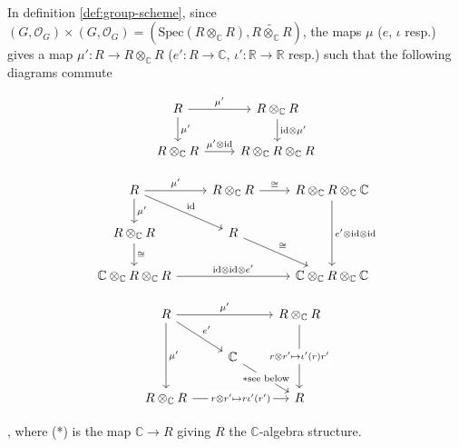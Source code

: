 \documentclass{article}
\theoremstyle{definition}
\newcommand{\Spec}{\mathrm{Spec}}
\newcommand{\ssheaf}[1]{\widetilde{#1}}
\newcommand{\tensorC}[2]{#1\otimes_\mathbb C #2}
\newcommand{\tensor}[2]{#1\otimes#2}
\newcommand{\so}[1]{(#1, \mathcal O_{#1})}
\newcommand{\id}{\mathrm{id}}
\newcommand{\srb}[1]{(\Spec{(#1)},\ssheaf{#1})}
\begin{document}
\paragraph{} In definition \ref{def:group-scheme}, since $\so G\times\so G=\srb{\tensorC R R}$, the maps $\mu$ ($e$, $\iota$ resp.) gives a map $\mu':R\to\tensorC R R$ ($e' : R\to \mathbb C$, $\iota':\mathbb R\to\mathbb R$ resp.) such that the following diagrams commute

\noindent%
\begin{minipage}{0.25\linewidth}
\begin{equation*}
\begin{tikzcd}
R \arrow[r, "\mu'"] \arrow[d, "\mu'"]& \tensorC R R \arrow[d, "\tensor\id\mu'"]\\
\tensorC R R \arrow[r, "\tensor{\mu'}{\id}"] & \tensorC R{\tensorC R R}
\end{tikzcd}    
\end{equation*}
\end{minipage}%
\begin{minipage}{0.5\linewidth}
\begin{equation*}
\begin{tikzcd}
R \arrow[r, "\mu'"]\arrow[d, "\mu'"]\arrow[rd,"\id"] & \tensorC R R \arrow[r, "\cong"] & \tensorC R {\tensorC R {\mathbb C}}\arrow[dd,"{\tensor{e'}{\tensor\id\id}}"]\\
\tensorC R R\arrow[d, "\cong"] & R\arrow[rd, "\cong"] \\
\tensorC{\mathbb C}{\tensorC R R}\arrow[rr, "{\tensor\id{\tensor\id{e'}}}"] & & \tensorC{\mathbb C}{\tensorC R \mathbb C}
\end{tikzcd}
\end{equation*}
\end{minipage}%
\begin{minipage}{0.25\linewidth}
\begin{equation*}
\begin{tikzcd}
R \arrow[rr, "\mu'"]\arrow[dd,"\mu'"]\arrow[rd, "e'"]& & \tensorC R R \arrow[dd, "\tensor{r}{r'}\mapsto\iota'(r)r'" description]\\
& \mathbb C\arrow[rd, "*\text{see below}" description] & \\
\tensorC R R \arrow[rr, "\tensor{r}{r'}\mapsto r\iota'(r')" description]& & R
\end{tikzcd}
\end{equation*}
\end{minipage},
where (*) is the map $\mathbb C\to R$ giving $R$ the $\mathbb C$-algebra structure.
\end{document}
